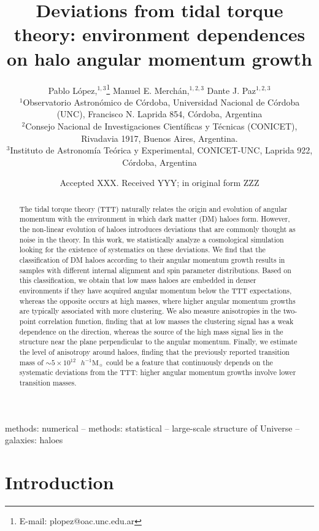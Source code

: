 \documentclass[fleqn,usenatbib]{mnras}
\title[Environment dependences on angular momentum growth]{Deviations from tidal torque theory: environment dependences on halo angular momentum growth}
\author[L\'opez, Merch\'an \& Paz]{
Pablo L\'opez,$^{1,3}$\thanks{E-mail: plopez@oac.unc.edu.ar}
Manuel E. Merch\'an,$^{1,2,3}$
Dante J. Paz$^{1,2,3}$
\\
$^{1}$Observatorio Astron\'omico de C\'ordoba, Universidad Nacional de C\'ordoba (UNC), Francisco N. Laprida 854, C\'ordoba, Argentina\\
$^{2}$Consejo Nacional de Investigaciones Cient\'ificas y T\'ecnicas (CONICET), Rivadavia 1917, Buenos Aires, Argentina.\\
$^{3}$Instituto de Astronom\'ia Te\'orica y Experimental, CONICET-UNC, Laprida 922, C\'ordoba, Argentina\\
}
\date{Accepted XXX. Received YYY; in original form ZZZ}
\newcommand{\hMsun}{{\textrm{ $h^{-1}$M$_{\sun}$}}}
\begin{document}
\label{firstpage}
\pagerange{\pageref{firstpage}--\pageref{lastpage}}
\maketitle

\begin{abstract}
The tidal torque theory (TTT) naturally relates the origin and evolution of angular momentum with the environment in which dark matter (DM) haloes form. However, the non-linear evolution of haloes introduces deviations that are commonly thought as noise in the theory. In this work, we statistically analyze a cosmological simulation looking for the existence of systematics on these deviations. We find that the classification of DM haloes according to their angular momentum growth results in samples with different internal alignment and spin parameter distributions. Based on this classification, we obtain that low mass haloes are embedded in denser environments if they have acquired angular momentum below the TTT expectations, whereas the opposite occurs at high masses, where higher angular momentum growths are typically associated with more clustering. We also measure anisotropies in the two-point correlation function, finding that at low masses the clustering signal has a weak dependence on the direction, whereas the source of the high mass signal lies in the structure near the plane perpendicular to the angular momentum. Finally, we estimate the level of anisotropy around haloes, finding that the previously reported transition mass of $\sim 5\times 10^{12}\hMsun$ could be a feature that continuously depends on the systematic deviations from the TTT: higher angular momentum growths involve lower transition masses.
\end{abstract}

\begin{keywords}
methods: numerical -- methods: statistical -- large-scale structure of Universe -- galaxies: haloes
\end{keywords}



\section{Introduction}
\end{document}
